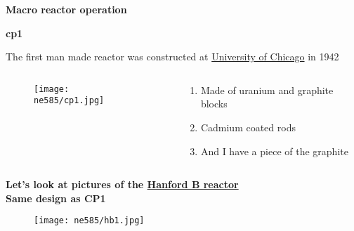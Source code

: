 \documentclass[aspectratio=1610,pdftex,dvipsnames,compress,xcolor={dvipsnames}]{beamer}
\newcommand{\acf}{\acrfull} %
\begin{document}
\begin{frame}[plain]{}
    \centering\LARGE\textbf{Macro reactor operation}
\end{frame}


\begin{frame}[plain]{}
    \centering\LARGE\textbf{\acf{cp1}}
\end{frame}


\addtocounter{framenumber}{-2} 
\begin{frame}{The first man made reactor was constructed at \href{https://uidaho.pressbooks.pub/nuclearengineering/chapter/front-end-of-the-fuel-cycle-2/}{University of Chicago} in 1942}
    \begin{columns}[c]

        \begin{column}{0.55\textwidth}
            \begin{figure}
                \centering
                \texttt{[image: ne585/cp1.jpg]}
            \end{figure}
        \end{column}

        \begin{column}{0.45\textwidth}
            \begin{enumerate}[series=outerlist,topsep=0pt,itemsep=21pt,leftmargin=*,label=(\arabic*)]
                \item[]Made of uranium and graphite blocks
                \item[]Cadmium coated rods
                \item[]And I have a piece of the graphite
            \end{enumerate}
        \end{column}

    \end{columns}
\end{frame}


\begin{frame}[plain]{}
    \centering\LARGE\textbf{Let's look at pictures of the \href{https://uidaho.pressbooks.pub/nuclearengineering/chapter/front-end-of-the-fuel-cycle-2/}{Hanford B reactor}}\\
    \centering\large\textbf{Same design as CP1}
\end{frame}


\addtocounter{framenumber}{-1} 
\begin{frame}{}
    \begin{figure}
        \centering
        \texttt{[image: ne585/hb1.jpg]}
    \end{figure}
\end{frame}
\end{document}
